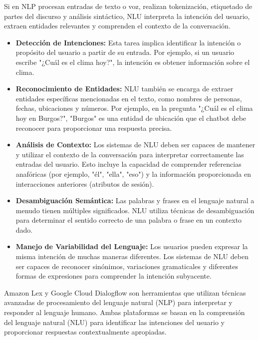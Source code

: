 Si en NLP procesan entradas de texto o voz, realizan tokenización, etiquetado de partes del discurso y análisis sintáctico, NLU interpreta la intención del usuario, extraen entidades relevantes y comprenden el contexto de la conversación.

\begin{itemize}
\item \textbf{Detección de Intenciones:} Esta tarea implica identificar la intención o propósito del usuario a partir de su entrada. Por ejemplo, si un usuario escribe "¿Cuál es el clima hoy?", la intención es obtener información sobre el clima. 
\item \textbf{Reconocimiento de Entidades:} NLU también se encarga de extraer entidades específicas mencionadas en el texto, como nombres de personas, fechas, ubicaciones y números. Por ejemplo, en la pregunta "¿Cuál es el clima hoy en Burgos?", "Burgos" es una entidad de ubicación que el chatbot debe reconocer para proporcionar una respuesta precisa.
\item \textbf{Análisis de Contexto:} Los sistemas de NLU deben ser capaces de mantener y utilizar el contexto de la conversación para interpretar correctamente las entradas del usuario. Esto incluye la capacidad de comprender referencias anafóricas (por ejemplo, "él", "ella", "eso") y la información proporcionada en interacciones anteriores (atributos de sesión).
\item \textbf{Desambiguación Semántica:} Las palabras y frases en el lenguaje natural a menudo tienen múltiples significados. NLU utiliza técnicas de desambiguación para determinar el sentido correcto de una palabra o frase en un contexto dado.
\item \textbf{Manejo de Variabilidad del Lenguaje:} Los usuarios pueden expresar la misma intención de muchas maneras diferentes. Los sistemas de NLU deben ser capaces de reconocer sinónimos, variaciones gramaticales y diferentes formas de expresiones para comprender la intención subyacente.
\end{itemize}

Amazon Lex y Google Cloud Dialogflow son herramientas que utilizan técnicas avanzadas de procesamiento del lenguaje natural (NLP) para interpretar y responder al lenguaje humano. Ambas plataformas se basan en la comprensión del lenguaje natural (NLU) para identificar las intenciones del usuario y proporcionar respuestas contextualmente apropiadas.


